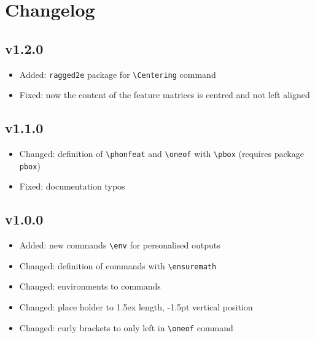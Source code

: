 \documentclass[a4paper]{article}
\begin{document}
\section{Changelog}
\subsection{v1.2.0}
\begin{itemize}
\item Added: \texttt{ragged2e} package for \verb+\Centering+ command
\item Fixed: now the content of the feature matrices is centred and not left aligned
\end{itemize}

\subsection{v1.1.0}
\begin{itemize}
\item Changed: definition of \verb+\phonfeat+ and \verb+\oneof+ with \verb+\pbox+ (requires package \texttt{pbox})
\item Fixed: documentation typos
\end{itemize}

\subsection{v1.0.0}
\begin{itemize}
\item Added: new commands \verb|\env| for personalised outputs
\item Changed: definition of commands with \verb|\ensuremath|
\item Changed: environments to commands
\item Changed: place holder to 1.5ex length, -1.5pt vertical position
\item Changed: curly brackets to only left in \verb|\oneof| command
\end{itemize}
\end{document}
